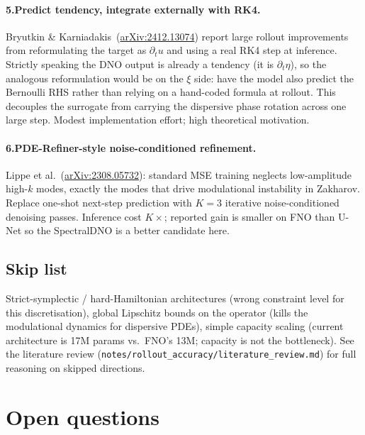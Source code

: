 \documentclass[11pt,letterpaper]{article}
\begin{document}
\paragraph{5.\;Predict tendency, integrate externally with RK4.}
Bryutkin \& Karniadakis~(\href{https://arxiv.org/abs/2412.13074}{arXiv:2412.13074})
report large rollout improvements from reformulating the target as
$\partial_{t}u$ and using a real RK4 step at inference. Strictly
speaking the DNO output is already a tendency (it is
$\partial_{t}\eta$), so the analogous reformulation would be on the
$\xi$ side: have the model also predict the Bernoulli RHS rather than
relying on a hand-coded formula at rollout. This decouples the
surrogate from carrying the dispersive phase rotation across one large
step. Modest implementation effort; high theoretical motivation.

\paragraph{6.\;PDE-Refiner-style noise-conditioned refinement.}
Lippe et al.~(\href{https://arxiv.org/abs/2308.05732}{arXiv:2308.05732}):
standard MSE training neglects low-amplitude high-$k$ modes, exactly
the modes that drive modulational instability in Zakharov. Replace
one-shot next-step prediction with $K=3$ iterative noise-conditioned
denoising passes. Inference cost $K\times$; reported gain is smaller
on FNO than U-Net so the SpectralDNO is a better candidate here.

\subsection{Skip list}

Strict-symplectic / hard-Hamiltonian architectures (wrong constraint
level for this discretisation), global Lipschitz bounds on the operator
(kills the modulational dynamics for dispersive PDEs), simple capacity
scaling (current architecture is 17M params vs.\ FNO's 13M; capacity is
not the bottleneck). See the literature review
(\texttt{notes/rollout\_accuracy/literature\_review.md}) for full
reasoning on skipped directions.

\section{Open questions}
\end{document}
